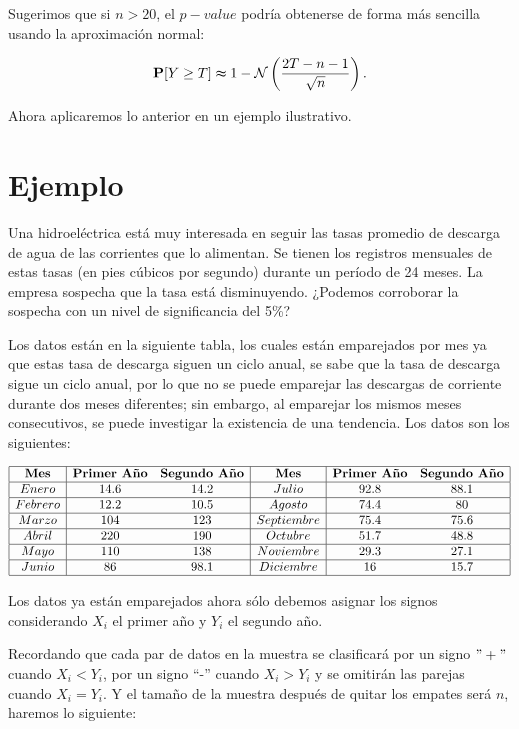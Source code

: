 \documentclass[
  a4paper,
  oneside,
  openany]{book}
\begin{document}
Sugerimos que si \(n > 20\), el \(p-value\) podría obtenerse de forma más sencilla usando la aproximación normal:

\[\mathbf{P}[Y\geq T] \thickapprox 1- \mathcal{N} \left(\frac{2T-n-1}{\sqrt{n}}\right).\]

Ahora aplicaremos lo anterior en un ejemplo ilustrativo.

\hypertarget{ejemplo-4}{%
\section{Ejemplo}\label{ejemplo-4}}

Una hidroeléctrica está muy interesada en seguir las tasas promedio de descarga de agua de las corrientes que lo alimentan. Se tienen los registros mensuales de estas tasas (en pies cúbicos por segundo) durante un período de 24 meses.
La empresa sospecha que la tasa está disminuyendo. ¿Podemos corroborar la sospecha con un nivel de significancia del 5\%?

Los datos están en la siguiente tabla, los cuales están emparejados por mes ya que estas tasa de descarga siguen un ciclo anual, se sabe que la tasa de descarga sigue un ciclo anual, por lo que no se puede emparejar las descargas de corriente durante dos meses diferentes; sin embargo, al emparejar los mismos meses consecutivos, se puede investigar la existencia de una tendencia. Los datos son los siguientes:

\[
\begin{array}{|c| c c|c| c c|} 
\hline
\textbf{Mes} & \textbf{Primer Año} & \textbf{Segundo Año} & \textbf{Mes} & \textbf{Primer Año} & \textbf{Segundo Año}\\
\hline
Enero & 14.6 & 14.2 & Julio & 92.8 & 88.1 \\
\hline
Febrero&12.2&10.5&Agosto&74.4&80 \\
\hline
Marzo&104&123&Septiembre&75.4&75.6 \\
\hline
Abril&220&190&Octubre&51.7&48.8 \\
\hline
Mayo&110&138&Noviembre&29.3&27.1 \\
\hline
Junio&86&98.1&Diciembre&16&15.7 \\
\hline
\end{array}
\]

Los datos ya están emparejados ahora sólo debemos asignar los signos considerando \(X_i\) el primer año y \(Y_i\) el segundo año.

Recordando que cada par de datos en la muestra se clasificará por un signo \("+"\) cuando \(X_{i} < Y_{i}\), por un signo ``-'' cuando \(X_{i} > Y_{i}\) y se omitirán las parejas cuando \(X_i = Y_i\). Y el tamaño de la muestra después de quitar los empates será \(n\), haremos lo siguiente:
\end{document}
